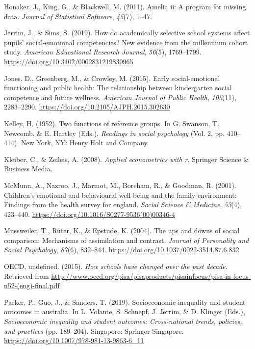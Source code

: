 \documentclass[
  english,
  man]{apa6}
\newlength{\cslhangindent}
\newenvironment{cslreferences}%
  {\setlength{\parindent}{0pt}%
  \everypar{\setlength{\hangindent}{\cslhangindent}}\ignorespaces}%
  {\par}
\begin{document}
\begin{cslreferences}
\leavevmode\hypertarget{ref-honaker2011}{}%
Honaker, J., King, G., \& Blackwell, M. (2011). Amelia ii: A program for missing data. \emph{Journal of Statistical Software}, \emph{45}(7), 1--47.

\leavevmode\hypertarget{ref-jerrim2019}{}%
Jerrim, J., \& Sims, S. (2019). How do academically selective school systems affect pupils' social-emotional competencies? New evidence from the millennium cohort study. \emph{American Educational Research Journal}, \emph{56}(5), 1769--1799. \url{https://doi.org/10.3102/0002831219830965}

\leavevmode\hypertarget{ref-jones2015}{}%
Jones, D., Greenberg, M., \& Crowley, M. (2015). Early social-emotional functioning and public health: The relationship between kindergarten social competence and future wellness. \emph{American Journal of Public Health}, \emph{105}(11), 2283--2290. \url{https://doi.org/10.2105/AJPH.2015.302630}

\leavevmode\hypertarget{ref-kelley1952}{}%
Kelley, H. (1952). Two functions of reference groups. In G. Swanson, T. Newcomb, \& E. Hartley (Eds.), \emph{Readings in social psychology} (Vol. 2, pp. 410--414). New York, NY: Henry Holt and Company.

\leavevmode\hypertarget{ref-kleiber2008}{}%
Kleiber, C., \& Zeileis, A. (2008). \emph{Applied econometrics with r}. Springer Science \& Business Media.

\leavevmode\hypertarget{ref-mcmunn2001}{}%
McMunn, A., Nazroo, J., Marmot, M., Boreham, R., \& Goodman, R. (2001). Children's emotional and behavioural well-being and the family environment: Findings from the health survey for england. \emph{Social Science \& Medicine}, \emph{53}(4), 423--440. \url{https://doi.org/10.1016/S0277-9536(00)00346-4}

\leavevmode\hypertarget{ref-mussweiler2004}{}%
Mussweiler, T., Rüter, K., \& Epstude, K. (2004). The ups and downs of social comparison: Mechanisms of assimilation and contrast. \emph{Journal of Personality and Social Psychology}, \emph{87}(6), 832--844. \url{https://doi.org/10.1037/0022-3514.87.6.832}

\leavevmode\hypertarget{ref-oecd2015}{}%
OECD, undefined. (2015). \emph{How schools have changed over the past decade}. Retrieved from \url{http://www.oecd.org/pisa/pisaproducts/pisainfocus/pisa-in-focus-n52-(eng)-final.pdf}

\leavevmode\hypertarget{ref-parker2019}{}%
Parker, P., Guo, J., \& Sanders, T. (2019). Socioeconomic inequality and student outcomes in australia. In L. Volante, S. Schnepf, J. Jerrim, \& D. Klinger (Eds.), \emph{Socioeconomic inequality and student outcomes: Cross-national trends, policies, and practices} (pp. 189--204). Singapore: Springer Singapore. \url{https://doi.org/10.1007/978-981-13-9863-6_11}


\end{cslreferences}
\end{document}
